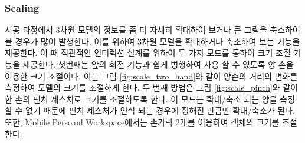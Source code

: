 

\subsubsection{Scaling}
시공 과정에서 3차원 모델의 정보를 좀 더 자세히 확대하여 보거나 큰 그림을 축소하여 볼 경우가 많이 발생한다. 이를 위하여 3차원 모델을 확대하거나 축소하여 보는 기능을 제공한다. 이 때 직관적인 인터렉션 설계를 위하여 두 가지 모드를 통하여 크기 조절 기능을 제공한다. 첫번째는 앞의 회전 기능과 쉽게 병행하여 사용 할 수 있도록 양 손을 이용한 크기 조절이다. 이는 그림 \ref{fig:scale_two_hand}와 같이 양손의 거리의 변화를 측정하여 모델의 크기를 조절하게 한다. 두 번째 방법은 그림 \ref{fig:scale_pinch}와 같이 한 손의 핀치 제스처로 크기를 조절하도록 한다. 이 모드는 확대/축소 되는 양을 측정할 수 없기 때문에 핀치 제스처가 인식 되는 경우에 정해진 만큼만 확대/축소가 된다.또한, Mobile Persoanl Workspace에서는 손가락 2개를 이용하여 객체의 크기를 조절한다.


